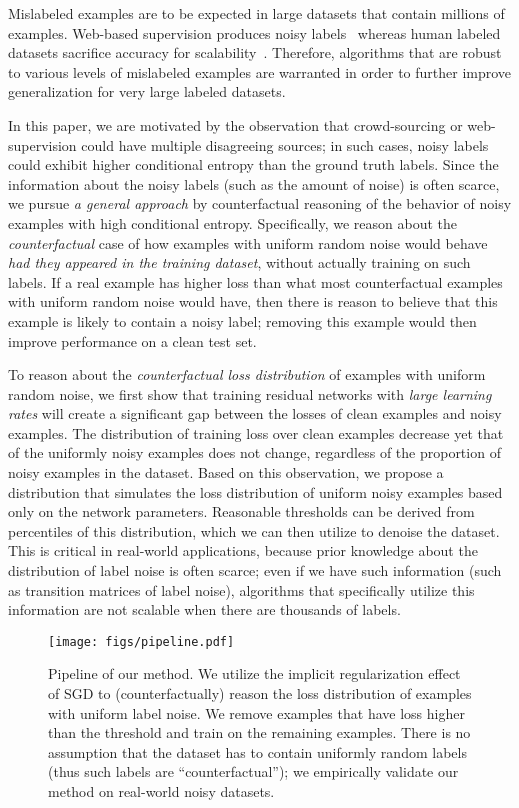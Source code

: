 \documentclass[a4paper,11pt]{article}
\begin{document}
Mislabeled examples are to be expected in large datasets that contain millions of examples. Web-based supervision produces noisy labels~\cite{li2017webvision,mahajan2018exploring} whereas human labeled datasets sacrifice accuracy for scalability~\cite{krishna2016embracing}. 
Therefore, algorithms that are robust to various levels of mislabeled examples are warranted in order to further improve generalization for very large labeled datasets.

In this paper, we are motivated by the observation that crowd-sourcing or web-supervision could have multiple disagreeing sources; in such cases, noisy labels could exhibit higher conditional entropy than the ground truth labels. 
Since the information about the noisy labels (such as the amount of noise) is often scarce, we pursue \textit{a general approach} by counterfactual reasoning of the behavior of noisy examples with high conditional entropy.
Specifically, we reason about the \textit{counterfactual} case of how examples with uniform random noise would behave \textit{had they appeared in the training dataset}, without actually training on such labels. If a real example has higher loss than what most counterfactual examples with uniform random noise would have, then there is reason to believe that this example is likely to contain a noisy label; removing this example would then improve performance on a clean test set. 


To reason about the \textit{counterfactual loss distribution} of examples with uniform random noise, we first show that training residual networks with \textit{large learning rates} will create a significant gap between the losses of clean examples and noisy examples. The distribution of training loss over clean examples decrease yet that of the uniformly noisy examples does not change, regardless of the proportion of noisy examples in the dataset.
Based on this observation, we propose a distribution that simulates the loss distribution of uniform noisy examples based only on the network parameters. Reasonable thresholds can be derived from percentiles of this distribution, which we can then utilize to denoise the dataset. This is critical in real-world applications, because prior knowledge about the distribution of label noise is often scarce; even if we have such information (such as transition matrices of label noise), algorithms that specifically utilize this information are not scalable when there are thousands of labels.

\begin{figure*}[t]
    \centering
    \texttt{[image: figs/pipeline.pdf]}
    \caption{Pipeline of our method. We utilize the implicit regularization effect of SGD to (counterfactually) reason the loss distribution of examples with uniform label noise. We remove examples that have loss higher than the threshold and train on the remaining examples. There is no assumption that the dataset has to contain uniformly random labels (thus such labels are ``counterfactual''); we empirically validate our method on real-world noisy datasets.}
    \label{fig:pipeline}
\end{figure*}
\end{document}
